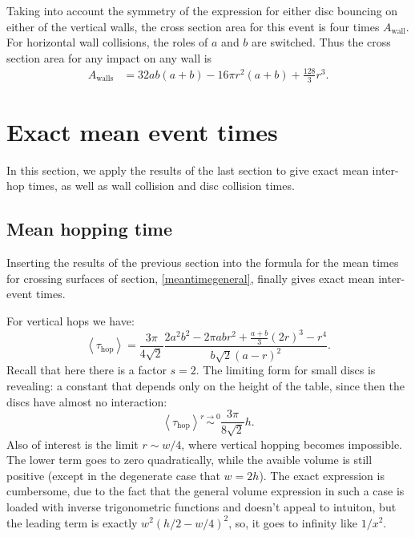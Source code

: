 \documentclass[superscriptaddress,pre,reprint,showpacs,onecolumn]{revtex4-1}
\newcommand{\mean}[1]{\left \langle #1 \right \rangle}
\begin{document}
Taking into account the symmetry of the expression for either disc
 bouncing on either of the vertical walls, the
cross section area for this event is four times $A_\textrm{wall}$. For horizontal wall 
collisions, the roles of $a$ and $b$ are switched.
Thus the cross section area for any impact on any wall is
\begin{align}\label{areawalls}
 A_\text{walls} & = 32 a b (a+b)-16 \pi r^2 (a+b) +\frac{128}{3}r^3.
\end{align}


\section{Exact mean event times}

In this section, we apply the results of the last section to give
exact mean inter-hop times, as well as wall collision and disc collision times.

\subsection{Mean hopping time}

 
Inserting the results of the previous section 
into the formula for the mean times for crossing
surfaces of section, \eqref{meantimegeneral}, finally gives exact mean inter-event times.

For vertical
hops we have:
\begin{equation}\label{hoptau}
 \mean{\tau_\text{hop}} = 	
\frac{3 \pi}{4\sqrt{2}}
\frac{2 a^{2} b^{2}  - 2 \pi a b r^{2} + \textstyle \frac{a+b}{3}  (2r)^{3}  -  r^4}
{ b \sqrt{2}  ( a - r )^2}.
\end{equation}
Recall that here there is a factor $s = 2$.
The limiting form for small discs is revealing: a constant
that depends only on the height of the table, since then the discs have almost no interaction:
\begin{equation}\label{hoptaulimit}
 \mean{\tau_\text{hop}} \overset{r \to 0}{\sim}
\frac{3 \pi}{8\sqrt{2}}h.
\end{equation}
Also of interest is the limit $r\sim w/4$, where vertical hopping becomes
impossible.  The lower term goes to zero quadratically, while the avaible volume
is still positive (except in the degenerate case that $w=2h$). The exact expression
is cumbersome, due to the fact that the general volume expression in such a
case is loaded with inverse trigonometric functions and doesn't appeal to
intuiton, but the leading term is exactly $w^2(h/2-w/4)^2$, so, it goes to infinity
like $1/x^2$. 
\end{document}

